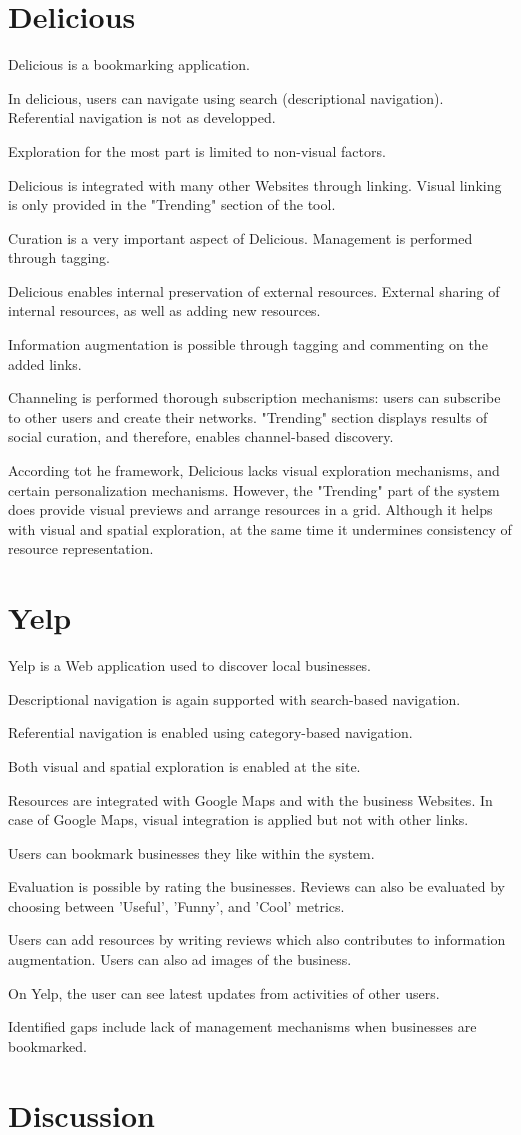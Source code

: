 {\section{Delicious}
Delicious is a bookmarking application. 

In delicious, users can navigate using search (descriptional navigation). Referential navigation is not as developped.

Exploration for the most part is limited to non-visual factors.

Delicious is integrated with many other Websites through linking. Visual linking is only provided in the "Trending" section of the tool.

Curation is a very important aspect of Delicious. Management is performed through tagging. 

Delicious enables internal preservation of external resources. External sharing of internal resources, as well as adding new resources. 

Information augmentation is possible through tagging and commenting on the added links.

Channeling is performed thorough subscription mechanisms: users can subscribe to other users and create their networks. 
"Trending" section displays results of social curation, and therefore, enables channel-based discovery.

According tot he framework, Delicious lacks visual exploration mechanisms, and certain personalization mechanisms. However, the "Trending" part of the system does provide visual previews and arrange resources in a grid. Although it helps with visual and spatial exploration, at the same time it undermines consistency of resource representation. 

} %

{\section{Yelp}
Yelp is a Web application used to discover local businesses. 

Descriptional navigation  is again supported with search-based navigation. 

Referential navigation is enabled using category-based navigation.

Both visual and spatial exploration is enabled at the site. 

Resources are integrated with Google Maps and with the business Websites. In case of Google Maps, visual integration is applied but not with other links.

Users can bookmark businesses they like within the system. 

Evaluation is possible by rating the businesses. Reviews can also be evaluated by choosing between 'Useful', 'Funny', and 'Cool' metrics.

Users can add resources by writing reviews which also contributes to information augmentation. Users can also ad images of the business. 

On Yelp, the user can see latest updates from activities of other users. 

Identified gaps include lack of management mechanisms when businesses are bookmarked.
} %

{\section{Discussion}

} %